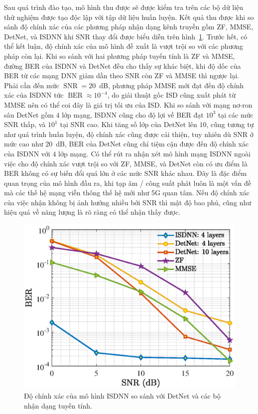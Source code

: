 Sau quá trình đào tạo, mô hình thu được sẽ được kiểm tra trên các bộ dữ liệu thử nghiệm được tạo độc lập với tập dữ liệu huấn luyện. Kết quả thu được khi so sánh độ chính xác của các phương pháp nhận dạng kênh truyền gồm ZF, MMSE, DetNet, và ISDNN khi SNR thay đổi được biểu diễn trên hình~\ref{fig:isdnn}. Trước hết, có thể kết luận, độ chính xác của mô hình đề xuất là vượt trội so với các phương pháp còn lại. Khi so sánh với hai phương pháp tuyến tính là ZF và MMSE, đường BER của ISDNN và DetNet đều cho thấy sự khác biệt, khi độ dốc của BER từ các mạng DNN giảm dần theo SNR còn ZF và MMSE thì ngược lại. Phải cần đến mức $\operatorname{SNR}=20$~dB, phương pháp MMSE mới đạt đến độ chính xác của ISDNN tức $\operatorname{BER}\approx 10^{-4}$, do giải thuật gốc ISD cũng xuất phát từ MMSE nên có thể coi đây là giá trị tối ưu của ISD. Khi so sánh với mạng nơ-ron sâu DetNet gồm $4$ lớp mạng, ISDNN cũng cho độ lợi về BER đạt $10^3$ tại các mức SNR thấp, và $10^1$ tại SNR cao. Khi tăng số lớp của DetNet lên $10$, cũng tương tự như quá trình huấn luyện, độ chính xác cũng được cải thiện, tuy nhiên dù SNR ở mức cao như $20$~dB, BER của DetNet cũng chỉ tiệm cận được đến độ chính xác của ISDNN với $4$ lớp mạng. Có thể rút ra nhận xét mô hình mạng ISDNN ngoài việc cho độ chính xác vượt trội so với ZF, MMSE, và DetNet còn có ưu điểm là BER không có sự biến đổi quá lớn ở các mức SNR khác nhau. Đây là đặc điểm quan trọng của mô hình đầu ra, khi tạp âm / công suất phát luôn là một vấn đề mà các thế hệ mạng viễn thông thế hệ mới như 5G quan tâm. Nếu độ chính xác của việc nhận không bị ảnh hưởng nhiều bởi SNR thì mật độ bao phủ, cũng như hiệu quả về năng lượng là rõ ràng có thể nhận thấy được.
\begin{figure}[ht]
    \centering
    \includegraphics[width=\linewidth]{figures/performance_1.eps}
    \caption{Độ chính xác của mô hình ISDNN so sánh với DetNet và các bộ nhận dạng tuyến tính.}
    \label{fig:isdnn}
\end{figure}

